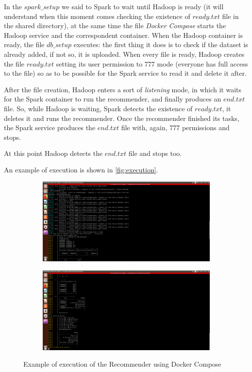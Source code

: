 \documentclass[11pt,a4paper,titlepage]{article}
\begin{document}
In the $spark\_setup$ we said to Spark to wait until Hadoop is ready (it will understand when this moment comes checking the existence of $ready.txt$ file in the shared directory), at the same time the file \textit{Docker Compose} starts the Hadoop service and the correspondent container. When the Hadoop container is ready, the file $db\_setup$ executes: the first thing it does is to check if the dataset is already added, if not so, it is uploaded. When every file is ready, Hadoop creates the file $ready.txt$ setting its user permission to 777 mode (everyone has full access to the file) so as to be possible for the Spark service to read it and delete it after.

After the file creation, Hadoop enters a sort of \textit{listening} mode, in which it waits for the Spark container to run the recommender, and finally produces an $end.txt$ file.
So, while Hadoop is waiting, Spark detects the existence of $ready.txt$, it deletes it and runs the recommender. Once the recommender finished its tasks, the Spark service produces the $end.txt$ file with, again, 777 permissions and stops.

At this point Hadoop detects the $end.txt$ file and stops too.

An example of execution is shown in \autoref{fig:execution}.

\begin{figure}[ht]
    \centering
    \begin{subfigure}[b]{.45\textwidth}
        \includegraphics[width=\textwidth]{Screenshot(120).png}
    \end{subfigure}
		\hspace{0.5cm}
		\begin{subfigure}[b]{.45\textwidth}
				\includegraphics[width=\textwidth]{Screenshot(119).png}
		\end{subfigure}
		\caption{Example of execution of the Recommender using Docker Compose}
		\label{fig:execution}
\end{figure}
\end{document}
